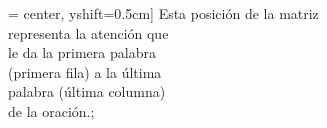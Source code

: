 = center, yshift=0.5cm] {\scriptsize{Esta posición de la matriz} \\ \scriptsize{representa la atención que} \\ \scriptsize{le da la primera palabra} \\
        \scriptsize{(primera fila) a la última} \\ \scriptsize{palabra (última columna)}\\
        \scriptsize{de la oración}.};
        